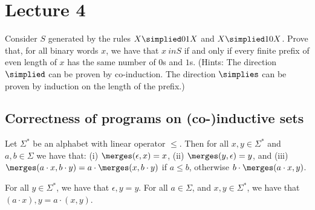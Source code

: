 
\section{Lecture 4}
\begin{exercise}
    Consider $S$ generated by the rules $X \simplied 01X$ and $X \simplied 10X$. 
	Prove that, for all binary words $x$, we have that $x\ in S$ if and only if every finite prefix of even length of $x$ has the same number of $0$s and $1$s.  
(Hints: The direction $\simplied$ can be proven by co-induction. The direction $\simplies$ can be proven by induction on the length of the prefix.)
\end{exercise}

\subsection{Correctness of programs on (co-)inductive sets}
\begin{definition}[$\merges$] Let $\Sigma^*$ be an alphabet with linear operator $\leq$. Then for all $x,y \in \Sigma^*$ and $a,b \in \Sigma$ we have that: (i) $\merges(\epsilon, x) = x$, (ii) $\merges(y, \epsilon) = y$, and (iii) $\merges(a\cdot x, b\cdot y) = a\cdot \merges(x, b\cdot y)$ if $a \leq b$, otherwise $b\cdot \merges(a\cdot x, y)$.
\end{definition}

\begin{definition}[Concatenation]
  \label{cl4:def:concat}
For all $y \in \Sigma^*$, we have that $\epsilon,y = y$.
For all $a \in \Sigma$, and $x,y \in \Sigma^*$, we have that $(a\cdot x), y = a \cdot (x,y)$.
  
\end{definition}

\begin{definition}
    \label{cl4:def2}
\end{definition}

